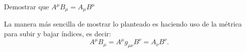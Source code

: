 \begin{exercise}
Demostrar que $A^{\mu }B_{\mu}=A_{\mu}B^{\mu}$
\end{exercise}
\begin{solution}
La manera más sencilla de mostrar lo planteado es haciendo uso de la métrica para subir y bajar índices, es decir:
\begin{equation}
    A^{\mu}B_{\mu}=A^{\mu}g_{\mu \nu}B^{\nu}=A_{\nu}B^{\nu}
    \label{30}.
\end{equation}

\end{solution}
